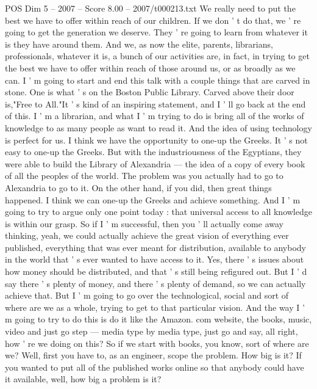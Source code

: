 \begin{textsample}{POS Dim 5 – 2007 – Score 8.00 – 2007/t000213.txt}  \label{ex:f5_pos_027}
We really need to put the best we have to offer within reach of our children.
If we don ' t do that, we ' re going to get the generation we deserve.
They ' re going to learn from whatever it is they have around them.
And we, as now the elite, parents, librarians, professionals, whatever it is, a bunch of our activities are, in fact, in trying to get the best we have to offer within reach of those around us, or as broadly as we can.
I ' m going to start and end this talk with a couple things that are carved in stone.
One is what ' s on the Boston Public Library.
Carved above their door is,"Free to All."It ' s kind of an inspiring statement, and I ' ll go back at the end of this.
I ' m a librarian, and what I ' m trying to do is bring all of the works of knowledge to as many people as want to read it.
And the idea of using technology is perfect for us.
I think we have the opportunity to one-up the Greeks.
It ' s not easy to one-up the Greeks.
But with the industriousness of the Egyptians, they were able to build the Library of Alexandria — the idea of a copy of every book of all the peoples of the world.
The problem was you actually had to go to Alexandria to go to it.
On the other hand, if you did, then great things happened.
I think we can one-up the Greeks and achieve something.
And I ' m going to try to argue only one point today : that universal access to all knowledge is within our grasp.
So if I ' m successful, then you ' ll actually come away thinking, yeah, we could actually achieve the great vision of everything ever published, everything that was ever meant for distribution, available to anybody in the world that ' s ever wanted to have access to it.
Yes, there ' s issues about how money should be distributed, and that ' s still being refigured out.
But I ' d say there ' s plenty of money, and there ' s plenty of demand, so we can actually achieve that.
But I ' m going to go over the technological, social and sort of where are we as a whole, trying to get to that particular vision.
And the way I ' m going to try to do this is do it like the Amazon. com website, the books, music, video and just go step — media type by media type, just go and say, all right, how ' re we doing on this?
So if we start with books, you know, sort of where are we?
Well, first you have to, as an engineer, scope the problem.
How big is it?
If you wanted to put all of the published works online so that anybody could have it available, well, how big a problem is it?

\end{textsample}
